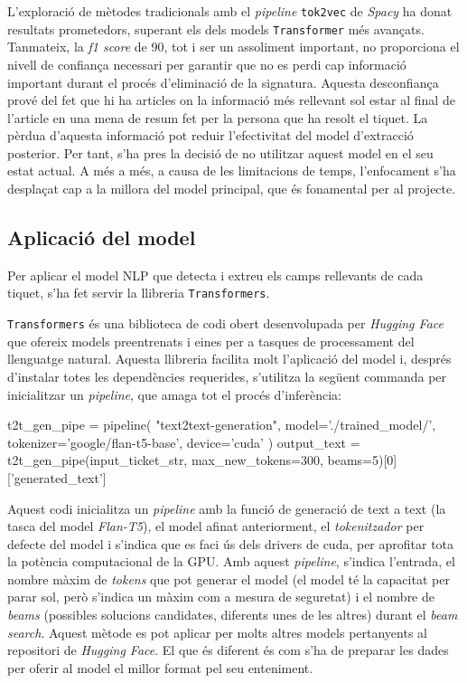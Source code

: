 L'exploració de mètodes tradicionals amb el \textit{pipeline} \texttt{tok2vec} de \textit{Spacy} ha donat resultats prometedors, superant els dels models \texttt{Transformer} més avançats. Tanmateix, la \textit{f1 score} de 90, tot i ser un assoliment important, no proporciona el nivell de confiança necessari per garantir que no es perdi cap informació important durant el procés d'eliminació de la signatura. Aquesta desconfiança prové del fet que hi ha articles on la informació més rellevant sol estar al final de l'article en una mena de resum fet per la persona que ha resolt el tiquet. La pèrdua d'aquesta informació pot reduir l'efectivitat del model d'extracció posterior. Per tant, s'ha pres la decisió de no utilitzar aquest model en el seu estat actual. A més a més, a causa de les limitacions de temps, l'enfocament s'ha desplaçat cap a la millora del model principal, que és fonamental per al projecte.

\subsection{Aplicació del model}
Per aplicar el model NLP que detecta i extreu els camps rellevants de cada tiquet, s'ha fet servir la llibreria \texttt{Transformers}.

\texttt{Transformers} és una biblioteca de codi obert desenvolupada per \textit{Hugging Face} \cite{Hugging-Face} que ofereix models preentrenats i eines per a tasques de processament del llenguatge natural. Aquesta llibreria facilita molt l'aplicació del model i, després d'instalar totes les dependències requerides, s'utilitza la següent commanda per inicialitzar un \textit{pipeline}, que amaga tot el procés d'inferència:

\begin{python}
t2t_gen_pipe = pipeline(
     "text2text-generation",
     model='./trained_model/',
     tokenizer='google/flan-t5-base',
     device='cuda'
     )     
output_text = t2t_gen_pipe(input_ticket_str, max_new_tokens=300, beams=5)[0]['generated_text']
\end{python}

Aquest codi inicialitza un \textit{pipeline} amb la funció de generació de text a text (la tasca del model \textit{Flan-T5}), el model afinat anteriorment, el \textit{tokenitzador} per defecte del model i s'indica que es faci ús dels drivers de cuda, per aprofitar tota la potència computacional de la GPU. Amb aquest \textit{pipeline}, s'indica l'entrada, el nombre màxim de \textit{tokens} que pot generar el model (el model té la capacitat per parar sol, però s'indica un màxim com a mesura de seguretat) i el nombre de \textit{beams} (possibles solucions candidates, diferents unes de les altres) durant el \textit{beam search}. Aquest mètode es pot aplicar per molts altres models pertanyents al repositori de \textit{Hugging Face}. El que és diferent és com s'ha de preparar les dades per oferir al model el millor format pel seu enteniment.

